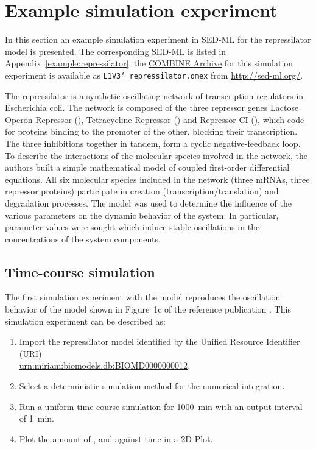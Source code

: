 \section{Example simulation experiment}
\label{motivation:example}
In this section an example simulation experiment in SED-ML for the repressilator model \citep{Elowitz:2000} is presented. The corresponding SED-ML is listed in Appendix~\ref{example:repressilator}, the \hyperref[sec:archive]{COMBINE Archive} for this simulation experiment is available as \texttt{L1V3\char`_repressilator.omex} from \url{http://sed-ml.org/}.

The repressilator is a synthetic oscillating network of transcription regulators in Escherichia coli. The network is composed of the three repressor genes Lactose Operon Repressor (), Tetracycline Repressor () and Repressor CI (), which code for proteins binding to the promoter of the other, blocking their transcription. The three inhibitions together in tandem, form a cyclic negative-feedback loop. To describe the interactions of the molecular species involved in the network, the authors built a simple mathematical model of coupled first-order differential equations. All six molecular species included in the network (three mRNAs, three repressor proteins) participate in creation (transcription/translation) and degradation processes. The model was used to determine the influence of the various parameters on the dynamic behavior of the system. In particular, parameter values were sought which induce stable oscillations in the concentrations of the system components.

\subsection{Time-course simulation}
\label{sec:timecourse}
The first simulation experiment with the model reproduces the oscillation behavior of the model shown in Figure~1c of the reference publication \citep{Elowitz:2000}. This simulation experiment can be described as:

\begin{enumerate}
 	\item{Import the repressilator model identified by the Unified Resource Identifier (URI) \citep{Berners-Lee:2005}\\ 	\url{urn:miriam:biomodels.db:BIOMD0000000012}.}
 	\item {Select a deterministic simulation method for the numerical integration.}
 	\item{Run a uniform time course simulation for 1000~min with an output interval of 1~min.}
 	\item{Plot the amount of ,  and  against time in a 2D Plot.}
 \end{enumerate}

